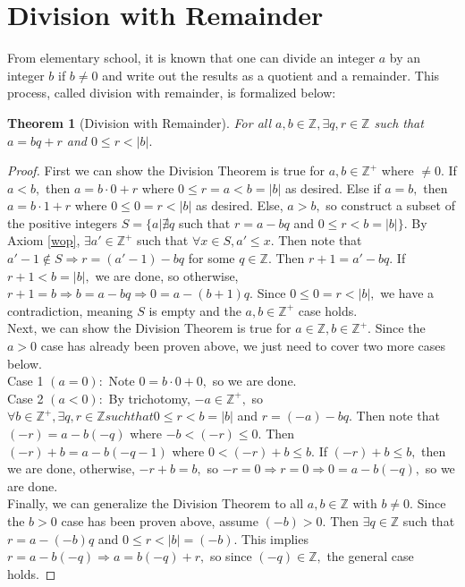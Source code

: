 \documentclass{article}
\newcommand{\Z}{\mathbb{Z}}
\newcommand{\st}{such that }
\newtheorem{thm}{Theorem}[section]
\begin{document}
\section{Division with Remainder}
From elementary school, it is known that one can divide an integer $a$ by an integer $b$ if $b \neq 0$ and write out the results as a quotient and a remainder. This process, called division with remainder, is formalized below:
\begin{thm}[Division with Remainder]
\label{division} For all $a,b\in \Z, \exists q,r\in \Z$ such that $a=bq+r$ and $0\leq r<|b|.$
\end{thm}
\begin{proof}
First we can show the Division Theorem is true for $a,b\in \Z^{+}$ where $\not=0.$ If $a<b,$ then $a=b\cdot0+r$ where $0\leq r=a < b=|b|$ as desired. Else if $a=b,$ then $a=b\cdot1+r$ where $0\leq0=r<|b|$ as desired. Else, $a>b,$ so construct a subset of the positive integers $S=\{a|\nexists q$ \st $r=a-bq$ and $0\leq r < b = |b|\}.$ By Axiom \ref{wop}, $\exists a'\in \Z^{+}$ \st $\forall x\in S, a'\leq x.$ Then note that $a'-1\not\in S \Rightarrow r=(a'-1)-bq$ for some $q\in \Z.$ Then $r+1=a'-bq.$ If $r+1<b=|b|,$ we are done, so otherwise, $r+1=b \Rightarrow b=a-bq \Rightarrow 0=a-(b+1)q.$ Since $0\leq0=r<|b|,$ we have a contradiction, meaning $S$ is empty and the $a,b\in \Z^{+}$ case holds.\\

\noindent Next, we can show the Division Theorem is true for $a\in \Z, b\in \Z^{+}.$ Since the $a>0$ case has already been proven above, we just need to cover two more cases below.\\

Case 1 $(a=0):$ Note $0=b\cdot0+0,$ so we are done.\\

Case 2 $(a<0):$ By trichotomy, $-a\in \Z^{+},$ so $\forall b\in \Z^{+}, \exists q,r\in \Z \st 0\leq r<b=|b|$ and $r=(-a)-bq.$ Then note that $(-r)=a-b(-q)$ where $-b<(-r)\leq0.$ Then $(-r)+b=a-b(-q-1)$ where $0<(-r)+b\leq b.$ If $(-r)+b \leq b,$ then we are done, otherwise, $-r+b=b,$ so $-r=0\Rightarrow r=0 \Rightarrow 0=a-b(-q),$ so we are done.\\

\noindent Finally, we can generalize the Division Theorem to all $a,b\in \Z$ with $b\not=0.$ Since the $b>0$ case has been proven above, assume $(-b)>0.$ Then $\exists q\in \Z$ such that $r=a-(-b)q$ and $0\leq r<|b|=(-b).$ This implies $r=a-b(-q) \Rightarrow a=b(-q)+r,$ so since $(-q)\in \Z,$ the general case holds.
\end{proof}
\end{document}
